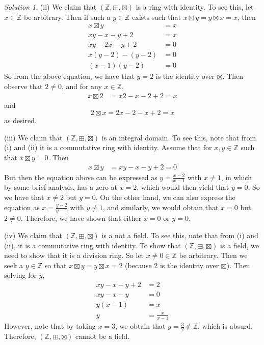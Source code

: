\documentclass[11pt]{amsart}
\theoremstyle{definition}\newtheorem{question}{Question}
\theoremstyle{definition}\newtheorem{claim}{Claim}
\theoremstyle{remark}\newtheorem*{solution}{Solution}
\newcommand{\Z}{\mathbb{Z}}
\begin{document}
\begin{solution}
    (ii) We claim that $(\Z, \boxplus, \boxtimes)$ is a ring with identity. To see this, let $x \in \Z$ be arbitrary. Then if such a $y \in \Z$ exists such that $x \boxtimes y = y \boxtimes x = x$, then
    \begin{align*}
        x \boxtimes y &= x \\
        xy - x - y + 2 &= x \\
        xy - 2x - y + 2 &= 0 \\
        x(y - 2) - (y - 2) &= 0 \\
        (x - 1)(y - 2) &= 0
    \end{align*}
    So from the above equation, we have that $y = 2$ is the identity over $\boxtimes$. Then observe that $2 \neq 0$, and for any $x \in \Z$,
    \begin{align*}
        x \boxtimes 2 &= x2 - x - 2 + 2 = x
    \end{align*}
    and
    \begin{equation*}
        2 \boxtimes x = 2x - 2 - x + 2 = x
    \end{equation*}
    as desired.

    (iii) We claim that $(\Z, \boxplus, \boxtimes)$ is an integral domain. To see this, note that from (i) and (ii) it is a commutative ring with identity. Assume that for $x, y \in \Z$ such that $x \boxtimes y = 0$. Then
    \begin{align*}
        x \boxtimes y &= xy - x - y + 2 = 0
    \end{align*}
    But then the equation above can be expressed as $y = \frac{x - 2}{x - 1}$ with $x \neq 1$, in which by some brief analysis, has a zero at $x = 2$, which would then yield that $y = 0$. So we have that $x \neq 2$ but $y = 0$. On the other hand, we can also express the equation as $x = \frac{y - 2}{y - 1}$ with $y \neq 1$, and similarly, we would obtain that $x = 0$ but $2 \neq 0$. Therefore, we have shown that either $x = 0$ or $y = 0$.

    (iv) We claim that $(\Z, \boxplus, \boxtimes)$ is a not a field. To see this, note that from (i) and (ii), it is a commutative ring with identity. To show that $(\Z, \boxplus, \boxtimes)$ is a field, we need to show that it is a division ring. So let $x \neq 0\in \Z$ be arbitrary. Then we seek a $y \in \Z$ so that $x \boxtimes y = y \boxtimes x = 2$ (because 2 is the identity over $\boxtimes$). Then solving for $y$,
    \begin{align*}
        xy - x - y + 2 &= 2 \\
        xy - x - y &= 0 \\
        y(x - 1) &= x \\
        y &= \frac{x}{x - 1}
    \end{align*}
    However, note that by taking $x = 3$, we obtain that $y = \frac{3}{2} \notin \Z$, which is absurd. Therefore, $(\Z, \boxplus, \boxtimes)$ cannot be a field.
\end{solution}
\end{document}
